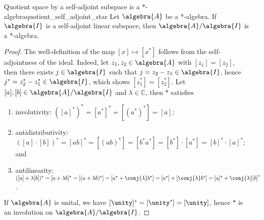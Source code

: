 \begin{lemma}{Quotient space by a self-adjoint subspace is a *-algebra}{quotient_self_adjoint_star}
    Let \(\algebra{A}\) be a *-algebra. If \(\algebra{I}\) is a self-adjoint linear subspace, then \(\algebra{A}/\algebra{I}\) is a *-algebra.
\end{lemma}
\begin{proof}
    The well-definition of the map \([x] \mapsto [x^*]\) follows from the self-adjointness of the ideal. Indeed, let \(z_1, z_2 \in \algebra{A}\) with \([z_1] = [z_2]\), then there exists \(j \in \algebra{I}\) such that \(j = z_2 - z_1 \in \algebra{I}\), hence \(j^* = z_2^* - z_1^* \in \algebra{I}\), which shows \([z_1^*] = [z_2^*]\). Let \([a], [b] \in \algebra{A}/\algebra{I}\) and \(\lambda\in \mathbb{C}\), then * satisfies
    \begin{enumerate}[label=(\alph*)]
        \item involutivity: \(\left([a]^*\right)^* = [a^*]^* = [(a^*)^*] = [a]\);
        \item antidistributivity: \(([a]\cdot[b])^* = [ab]^* = [(ab)^*] = [b^*a^*] = [b^*]\cdot[a^*] = [b]^* \cdot [a]^*\); and
        \item antilinearity: \(([a] + \lambda[b])^* = [a + \lambda b]^* = [(a + \lambda b)^*] = [a^* + \conj{\lambda}b^*] = [a^*] + [\conj{\lambda} b^*] = [a]^* + \conj{\lambda}[b]^*\).
    \end{enumerate}
    If \(\algebra{A}\) is unital, we have \([\unity]^* = [\unity^*] = [\unity]\), hence \(*\) is an involution on \(\algebra{A}/\algebra{I}\).
\end{proof}

